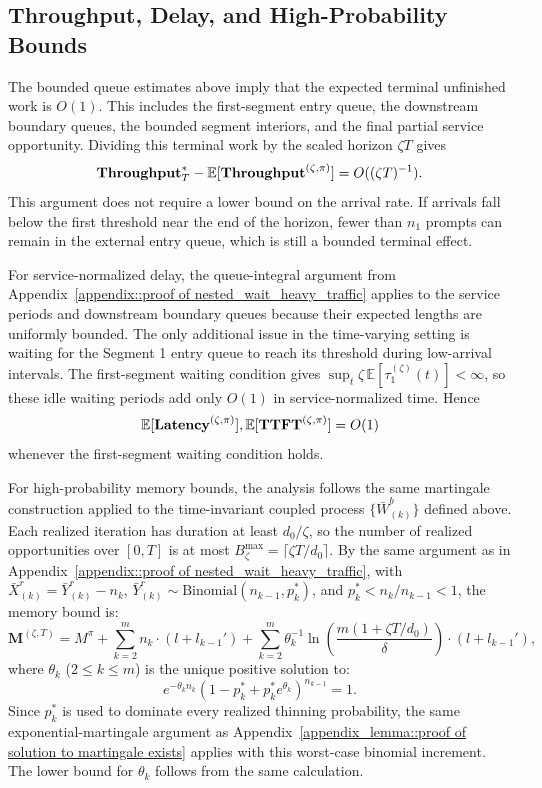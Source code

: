\subsection{Throughput, Delay, and High-Probability Bounds}

The bounded queue estimates above imply that the expected terminal unfinished work is \(O(1)\). This includes the first-segment entry queue, the downstream boundary queues, the bounded segment interiors, and the final partial service opportunity. Dividing this terminal work by the scaled horizon \(\zeta T\) gives
\[
    \textbf{Throughput}_T^*-\mathbb{E}[\textbf{Throughput}^{(\zeta,\pi)}]
    =
    O((\zeta T)^{-1}).
\]
This argument does not require a lower bound on the arrival rate. If arrivals fall below the first threshold near the end of the horizon, fewer than \(n_1\) prompts can remain in the external entry queue, which is still a bounded terminal effect.

For service-normalized delay, the queue-integral argument from Appendix~\ref{appendix::proof of nested_wait_heavy_traffic} applies to the service periods and downstream boundary queues because their expected lengths are uniformly bounded. The only additional issue in the time-varying setting is waiting for the Segment 1 entry queue to reach its threshold during low-arrival intervals. The first-segment waiting condition gives \(\sup_t\zeta\,\mathbb E[\tau_1^{(\zeta)}(t)]<\infty\), so these idle waiting periods add only \(O(1)\) in service-normalized time. Hence
\[
    \mathbb{E}[\textbf{Latency}^{(\zeta,\pi)}],
    \mathbb{E}[\textbf{TTFT}^{(\zeta,\pi)}]
    =
    O(1)
\]
whenever the first-segment waiting condition holds.

For high-probability memory bounds, the analysis follows the same martingale construction applied to the time-invariant coupled process $\{ \bar{W}_{(k)}^b \}$ defined above. Each realized iteration has duration at least \(d_0/\zeta\), so the number of realized opportunities over \([0,T]\) is at most \(B_\zeta^{\max}=\lceil \zeta T/d_0\rceil\). By the same argument as in Appendix~\ref{appendix::proof of nested_wait_heavy_traffic}, with $\bar{X}_{(k)}^{r} = \bar{Y}_{(k)}^r - n_k$, $\bar{Y}_{(k)}^r \sim \text{Binomial}(n_{k-1}, p_k^*)$, and $p_k^*<n_k/n_{k-1}<1$, the memory bound is:
$$\mathbf{M}^{(\zeta,T)} = M^\pi + \sum_{k=2}^m n_k \cdot (l + l_{k-1}') + \sum_{k=2}^m \theta_k^{-1}\ln\left( \frac{m(1+\zeta T/d_0)}{\delta} \right) \cdot (l + l_{k-1}'),$$
where $\theta_k$ ($2\leq k\leq m$) is the unique positive solution to:
\begin{equation}
e^{-\theta_k n_k} (1 - p_k^* + p_k^* e^{\theta_k})^{n_{k-1}} = 1.\label{eq::eq of theta, time varying}
\end{equation}
Since \(p_k^*\) is used to dominate every realized thinning probability, the same exponential-martingale argument as Appendix~\ref{appendix_lemma::proof of solution to martingale exists} applies with this worst-case binomial increment. The lower bound for \(\theta_k\) follows from the same calculation.
